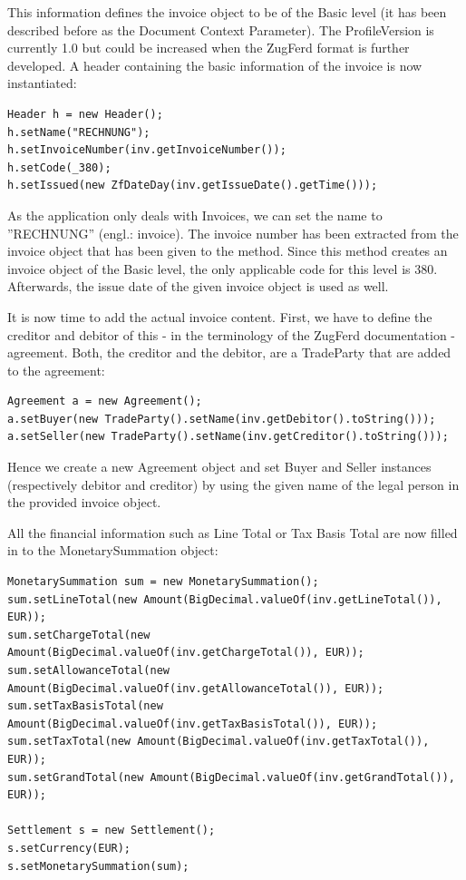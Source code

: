 This information defines the invoice object to be of the Basic level (it has been described before as the Document Context Parameter). The ProfileVersion is currently 1.0 but could be increased when the ZugFerd format is further developed.
A header containing the basic information of the invoice is now instantiated:

\begin{lstlisting}[caption={Populating header information}]
Header h = new Header();
h.setName("RECHNUNG");
h.setInvoiceNumber(inv.getInvoiceNumber());
h.setCode(_380);
h.setIssued(new ZfDateDay(inv.getIssueDate().getTime()));
\end{lstlisting}

As the application only deals with Invoices, we can set the name to ''RECHNUNG'' (engl.: invoice). The invoice number has been extracted from the invoice object that has been given to the method.
Since this method creates an invoice object of the Basic level, the only applicable code for this level is 380. Afterwards, the issue date of the given invoice object is used as well.

It is now time to add the actual invoice content. First, we have to define the creditor and debitor of this - in the terminology of the ZugFerd documentation - agreement. Both, the creditor and the debitor, are a TradeParty that are added to the agreement:

\begin{lstlisting}[caption={Creation of a new agreement}]
Agreement a = new Agreement();
a.setBuyer(new TradeParty().setName(inv.getDebitor().toString()));
a.setSeller(new TradeParty().setName(inv.getCreditor().toString()));
\end{lstlisting}

Hence we create a new Agreement object and set Buyer and Seller instances (respectively debitor and creditor) by using the given name of the legal person in the provided invoice object.

All the financial information such as Line Total or Tax Basis Total are now filled in to the MonetarySummation object:

\begin{lstlisting}[caption={Population of the MonetarySummation object}]
MonetarySummation sum = new MonetarySummation();
sum.setLineTotal(new Amount(BigDecimal.valueOf(inv.getLineTotal()), EUR));
sum.setChargeTotal(new Amount(BigDecimal.valueOf(inv.getChargeTotal()), EUR));
sum.setAllowanceTotal(new Amount(BigDecimal.valueOf(inv.getAllowanceTotal()), EUR));
sum.setTaxBasisTotal(new Amount(BigDecimal.valueOf(inv.getTaxBasisTotal()), EUR));
sum.setTaxTotal(new Amount(BigDecimal.valueOf(inv.getTaxTotal()), EUR));
sum.setGrandTotal(new Amount(BigDecimal.valueOf(inv.getGrandTotal()), EUR));

Settlement s = new Settlement();
s.setCurrency(EUR);
s.setMonetarySummation(sum);
\end{lstlisting}

